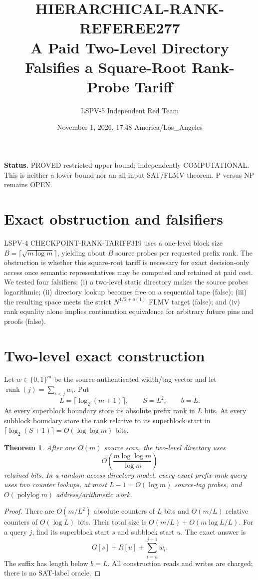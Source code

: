 \documentclass[11pt]{article}
\title{HIERARCHICAL-RANK-REFEREE277\\
\large A Paid Two-Level Directory Falsifies a Square-Root Rank-Probe Tariff}
\author{LSPV-5 Independent Red Team}
\date{November 1, 2026, 17:48 America/Los\_Angeles}
\newtheorem{theorem}{Theorem}
\begin{document}
\maketitle

\noindent\textbf{Status.} PROVED restricted upper bound; independently
COMPUTATIONAL. This is neither a lower bound nor an all-input SAT/FLMV
theorem. P versus NP remains OPEN.

\section{Exact obstruction and falsifiers}
LSPV-4 CHECKPOINT-RANK-TARIFF319 uses a one-level block size
$B=\lceil\sqrt{m\log m}\rceil$, yielding about $B$ source probes per requested
prefix rank. The obstruction is whether this square-root tariff is necessary
for exact decision-only access once semantic representatives may be computed
and retained at paid cost. We tested four falsifiers: (i) a two-level static
directory makes the source probes logarithmic; (ii) directory lookup becomes
free on a sequential tape (false); (iii) the resulting space meets the strict
$N^{1/2+o(1)}$ FLMV target (false); and (iv) rank equality alone implies
continuation equivalence for arbitrary future pins and proofs (false).

\section{Two-level exact construction}
Let $w\in\{0,1\}^m$ be the source-authenticated width/tag vector and let
$\operatorname{rank}(j)=\sum_{i<j}w_i$. Put
\[
 L=\lceil\log_2(m+1)\rceil,\qquad S=L^2,\qquad b=L.
\]
At every superblock boundary store its absolute prefix rank in $L$ bits.
At every subblock boundary store the rank relative to its superblock start in
$\lceil\log_2(S+1)\rceil=O(\log\log m)$ bits.

\begin{theorem}
After one $O(m)$ source scan, the two-level directory uses
\[
 O\!\left(\frac{m\log\log m}{\log m}\right)
\]
retained bits. In a random-access directory model, every exact prefix-rank
query uses two counter lookups, at most $L-1=O(\log m)$ source-tag probes, and
$O(\operatorname{polylog}m)$ address/arithmetic work.
\end{theorem}
\begin{proof}
There are $O(m/L^2)$ absolute counters of $L$ bits and $O(m/L)$ relative
counters of $O(\log L)$ bits. Their total size is
$O(m/L)+O(m\log L/L)$. For a query $j$, find its superblock start $s$ and
subblock start $u$. The exact answer is
\[
 G[s]+R[u]+\sum_{i=u}^{j-1}w_i.
\]
The suffix has length below $b=L$. All construction reads and writes are
charged; there is no SAT-label oracle.
\end{proof}
\end{document}
